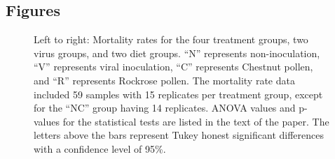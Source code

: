 \documentclass{bmcart}
\begin{document}
\begin{linenumbers}
\begin{backmatter}




\newpage
\section*{Figures}

\begin{figure}[h!]
\caption{
Left to right: Mortality rates for the four treatment groups, two virus groups, and two diet groups. ``N'' represents non-inoculation, ``V'' represents viral inoculation, ``C'' represents Chestnut pollen, and ``R'' represents Rockrose pollen. The mortality rate data included 59 samples with 15 replicates per treatment group, except for the ``NC'' group having 14 replicates. ANOVA values and p-values for the statistical tests are listed in the text of the paper. The letters above the bars represent Tukey honest significant differences with a confidence level of 95\%.}
\end{figure}


\end{backmatter}
\end{linenumbers}
\end{document}
